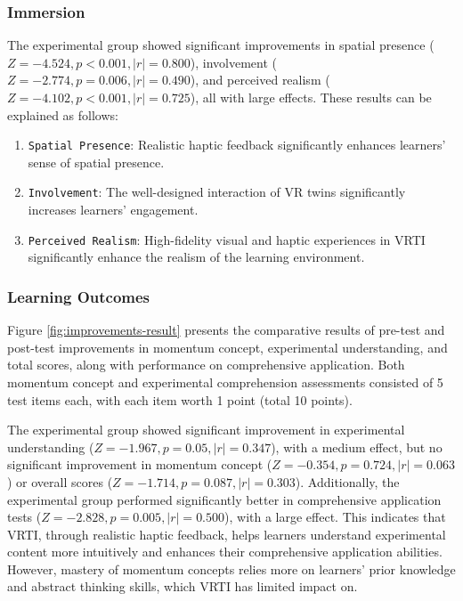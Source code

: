 \documentclass[runningheads]{llncs}
\begin{document}
\subsubsection{Immersion}
The experimental group showed significant improvements in spatial presence ($Z=-4.524, p<0.001, |r|=0.800$), involvement ($Z=-2.774, p=0.006, |r|=0.490$), and perceived realism ($Z=-4.102, p<0.001, |r|=0.725$), all with large effects. These results can be explained as follows:

\begin{enumerate}
  \item {\texttt{Spatial Presence}}: Realistic haptic feedback significantly enhances learners' sense of spatial presence.

  \item {\texttt{Involvement}}: The well-designed interaction of VR twins significantly increases learners' engagement.

  \item {\texttt{Perceived Realism}}: High-fidelity visual and haptic experiences in VRTI significantly enhance the realism of the learning environment.
\end{enumerate}

\subsubsection{Learning Outcomes}
Figure \ref{fig:improvements-result} presents the comparative results of pre-test and post-test improvements in momentum concept, experimental understanding, and total scores, along with performance on comprehensive application. Both momentum concept and experimental comprehension assessments consisted of 5 test items each, with each item worth 1 point (total 10 points).

The experimental group showed significant improvement in experimental understanding ($Z=-1.967, p=0.05, |r|=0.347$), with a medium effect, but no significant improvement in momentum concept ($Z=-0.354, p=0.724, |r|=0.063$) or overall scores ($Z=-1.714, p=0.087, |r|=0.303$). Additionally, the experimental group performed significantly better in comprehensive application tests ($Z=-2.828, p=0.005, |r|=0.500$), with a large effect. This indicates that VRTI, through realistic haptic feedback, helps learners understand experimental content more intuitively and enhances their comprehensive application abilities. However, mastery of momentum concepts relies more on learners' prior knowledge and abstract thinking skills, which VRTI has limited impact on.
\end{document}
